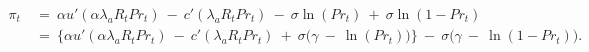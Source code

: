\begin{equation}
\begin{split}
    \pi_{t} \ 
    & = \ \alpha u'(\alpha \lambda_{a} R_{t} Pr_{t}) \ - \ c'(\lambda_{a} R_{t} Pr_{t}) \ - \ \sigma \ln(Pr_{t}) \ + \ \sigma \ln(1 - Pr_{t}) \\
    & = \ \big\{ \alpha u'(\alpha \lambda_{a} R_{t} Pr_{t}) \ - \ c'(\lambda_{a} R_{t} Pr_{t}) \ + \ \sigma \big( \gamma \ - \ \ln(Pr_{t}) \big) \big\} \ - \ \sigma \big( \gamma \ - \ \ln(1 - Pr_{t}) \big).
\end{split}
\label{Equation:Social-Planners-Problem_Meaning-of-Costate-Variable}
\end{equation}